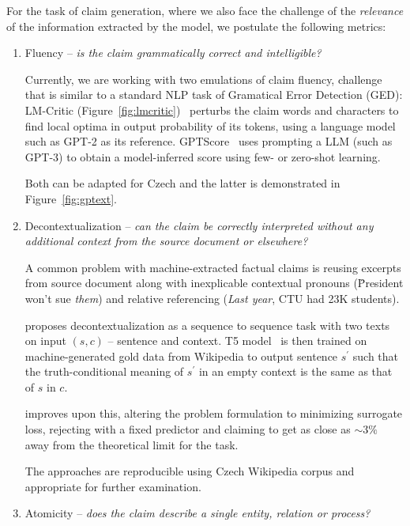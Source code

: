 For the task of claim generation, where we also face the challenge of the \textit{relevance} of the information extracted by the model, we postulate the following metrics:

\begin{enumerate}
    \item {\techbf Fluency} -- \textit{is the claim grammatically correct and intelligible?}
    
    Currently, we are working with two emulations of claim fluency, challenge that is similar to a standard NLP task of Gramatical Error Detection (GED): \textsf{LM-Critic} (Figure~\ref{fig:lmcritic})~\cite{yasunaga-etal-2021-lm} perturbs the claim words and characters to find local optima in output probability of its tokens, using a language model such as GPT-2 as its reference. \textsf{GPTScore}~\cite{fu2023gptscore} uses prompting a LLM (such as GPT-3) to obtain a model-inferred score using few- or zero-shot learning.
    
    Both can be adapted for Czech and the latter is demonstrated in Figure~\ref{fig:gptext}.
    \item {\techbf Decontextualization} -- \textit{can the claim be correctly interpreted without any additional context from the source document or elsewhere?}
    
    A common problem with machine-extracted factual claims is reusing excerpts from source document along with inexplicable contextual pronouns (\"{President won't sue \textit{them}}) and relative referencing (\"{\textit{Last year}, CTU had 23K students}).

\cite{choi-etal-2021-decontextualization} proposes decontextualization as a sequence to sequence task with two texts on input $(s,c)$ -- sentence and context.
    T5 model~\cite{t5-11b} is then trained on machine-generated gold data from Wikipedia to output sentence $s^\prime$ such that the truth-conditional meaning of $s^\prime$ in an empty context is the same as that of $s$ in $c$.

    \cite{mohri2023learning} improves upon this, altering the problem formulation to minimizing surrogate loss, rejecting with a fixed predictor and claiming to get as close as $\sim3\%$ away from the theoretical limit for the task.

    The approaches are reproducible using Czech Wikipedia corpus and appropriate for further examination.

    \item {\techbf Atomicity} --  \textit{does the claim describe a single entity, relation or process?}
    \label{atomicity}
    

\end{enumerate}
